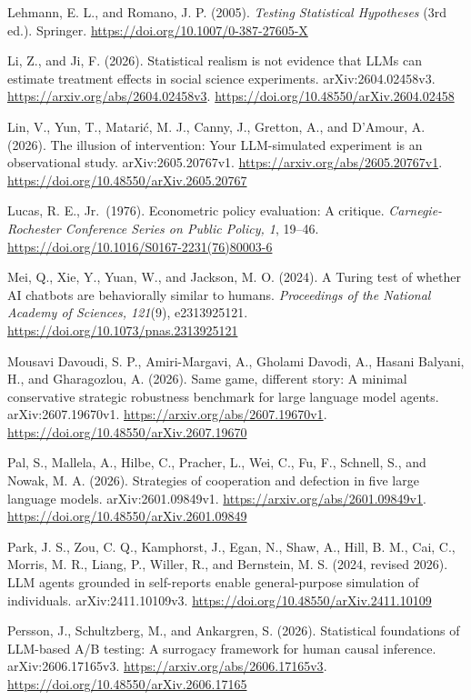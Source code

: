 \documentclass[11pt]{article}
\begin{document}
Lehmann, E. L., and Romano, J. P. (2005). \emph{Testing Statistical
Hypotheses} (3rd ed.). Springer.
\url{https://doi.org/10.1007/0-387-27605-X}

Li, Z., and Ji, F. (2026). Statistical realism is not evidence that LLMs
can estimate treatment effects in social science experiments.
arXiv:2604.02458v3. \url{https://arxiv.org/abs/2604.02458v3}.
\url{https://doi.org/10.48550/arXiv.2604.02458}

Lin, V., Yun, T., Matarić, M. J., Canny, J., Gretton, A., and D'Amour,
A. (2026). The illusion of intervention: Your LLM-simulated experiment
is an observational study. arXiv:2605.20767v1.
\url{https://arxiv.org/abs/2605.20767v1}.
\url{https://doi.org/10.48550/arXiv.2605.20767}

Lucas, R. E., Jr.~(1976). Econometric policy evaluation: A critique.
\emph{Carnegie-Rochester Conference Series on Public Policy, 1}, 19--46.
\url{https://doi.org/10.1016/S0167-2231(76)80003-6}

Mei, Q., Xie, Y., Yuan, W., and Jackson, M. O. (2024). A Turing test of
whether AI chatbots are behaviorally similar to humans.
\emph{Proceedings of the National Academy of Sciences, 121}(9),
e2313925121. \url{https://doi.org/10.1073/pnas.2313925121}

Mousavi Davoudi, S. P., Amiri-Margavi, A., Gholami Davodi, A., Hasani
Balyani, H., and Gharagozlou, A. (2026). Same game, different story: A
minimal conservative strategic robustness benchmark for large language
model agents. arXiv:2607.19670v1.
\url{https://arxiv.org/abs/2607.19670v1}.
\url{https://doi.org/10.48550/arXiv.2607.19670}

Pal, S., Mallela, A., Hilbe, C., Pracher, L., Wei, C., Fu, F., Schnell,
S., and Nowak, M. A. (2026). Strategies of cooperation and defection in
five large language models. arXiv:2601.09849v1.
\url{https://arxiv.org/abs/2601.09849v1}.
\url{https://doi.org/10.48550/arXiv.2601.09849}

Park, J. S., Zou, C. Q., Kamphorst, J., Egan, N., Shaw, A., Hill, B. M.,
Cai, C., Morris, M. R., Liang, P., Willer, R., and Bernstein, M. S.
(2024, revised 2026). LLM agents grounded in self-reports enable
general-purpose simulation of individuals. arXiv:2411.10109v3.
\url{https://doi.org/10.48550/arXiv.2411.10109}

Persson, J., Schultzberg, M., and Ankargren, S. (2026). Statistical
foundations of LLM-based A/B testing: A surrogacy framework for human
causal inference. arXiv:2606.17165v3.
\url{https://arxiv.org/abs/2606.17165v3}.
\url{https://doi.org/10.48550/arXiv.2606.17165}
\end{document}
